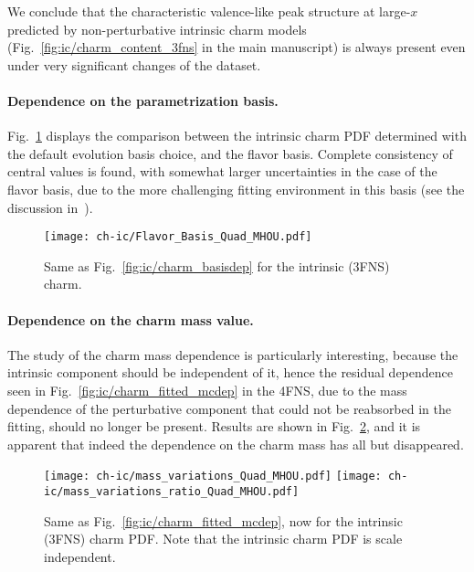We conclude that
the characteristic valence-like peak structure at large-$x$
predicted by non-perturbative intrinsic charm models (Fig.~\ref{fig:ic/charm_content_3fns}
in the main manuscript)
is always present even under very significant changes of the dataset.
%

\paragraph{Dependence on the parametrization basis.}
%
Fig.~\ref{fig:ic/charm_basisdep_3FNS} displays
the comparison between the intrinsic charm
PDF determined with the default evolution basis choice, and the flavor
basis. Complete consistency of central values is found, with somewhat
larger uncertainties in the case of the flavor basis, due to the more 
challenging fitting environment in this basis (see the discussion in~\cite{Ball:2021leu}).

\begin{figure}[t!]
  \begin{center}
    \texttt{[image: ch-ic/Flavor\_Basis\_Quad\_MHOU.pdf]}
    \caption{\small Same as Fig.~\ref{fig:ic/charm_basisdep}
    for the intrinsic (3FNS) charm.
  \label{fig:ic/charm_basisdep_3FNS} }
\end{center}
\end{figure}


\paragraph{Dependence on the charm mass value.}
%
The study of the charm mass dependence is particularly interesting,
because the intrinsic component should be independent of it, hence the
residual dependence seen in Fig.~\ref{fig:ic/charm_fitted_mcdep} in the
4FNS, due to the mass dependence of the perturbative component that
could not be reabsorbed in the fitting, should no longer be present. 
Results are shown in
Fig.~\ref{fig:ic/mass_variations_Quad_MHOU}, and it is apparent that
indeed the dependence on the charm mass has all but disappeared.


\begin{figure}[h]
  \begin{center}
\texttt{[image: ch-ic/mass\_variations\_Quad\_MHOU.pdf]}
    \texttt{[image: ch-ic/mass\_variations\_ratio\_Quad\_MHOU.pdf]}
\caption{\small      
 Same as Fig.~\ref{fig:ic/charm_fitted_mcdep}, now for
      the intrinsic (3FNS) charm PDF. Note that the intrinsic charm
      PDF is scale independent.
  \label{fig:ic/mass_variations_Quad_MHOU} }
\end{center}
\end{figure}



